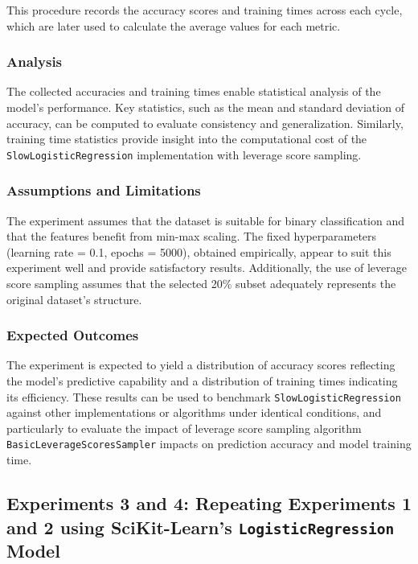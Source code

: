 \documentclass{article}
\theoremstyle{plain}
\theoremstyle{definition}
\theoremstyle{remark}
\begin{document}
This procedure records the accuracy scores and training times across each cycle, which are later used to calculate the average values for each metric.

\subsubsection{Analysis}

The collected accuracies and training times enable statistical analysis of the model's performance. Key statistics, such as the mean and standard deviation of accuracy, can be computed to evaluate consistency and generalization. Similarly, training time statistics provide insight into the computational cost of the \texttt{SlowLogisticRegression} implementation with leverage score sampling.

\subsubsection{Assumptions and Limitations}

The experiment assumes that the dataset is suitable for binary classification and that the features benefit from min-max scaling. The fixed hyperparameters (learning rate = 0.1, epochs = 5000), obtained empirically, appear to suit this experiment well and provide satisfactory results. Additionally, the use of leverage score sampling assumes that the selected 20\% subset adequately represents the original dataset's structure.

\subsubsection{Expected Outcomes}

The experiment is expected to yield a distribution of accuracy scores reflecting the model's predictive capability and a distribution of training times indicating its efficiency. These results can be used to benchmark \texttt{SlowLogisticRegression} against other implementations or algorithms under identical conditions, and particularly to evaluate the impact of leverage score sampling algorithm \texttt{BasicLeverageScoresSampler} impacts on prediction accuracy and model training time.


\subsection{Experiments 3 and 4: Repeating Experiments 1 and 2 using SciKit-Learn's \texttt{LogisticRegression} Model}
\end{document}
